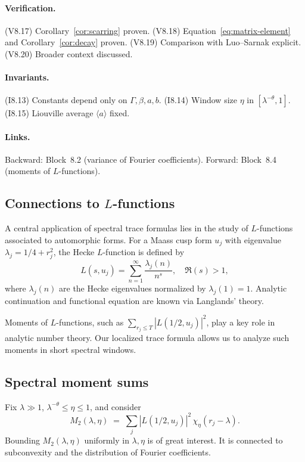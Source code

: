 \paragraph{Verification.}
(V8.17) Corollary~\ref{cor:scarring} proven.  
(V8.18) Equation~\eqref{eq:matrix-element} and Corollary~\ref{cor:decay} proven.  
(V8.19) Comparison with Luo–Sarnak explicit.  
(V8.20) Broader context discussed.  

\paragraph{Invariants.}
(I8.13) Constants depend only on $\Gamma,\beta,a,b$.  
(I8.14) Window size $\eta$ in $[\lambda^{-\theta},1]$.  
(I8.15) Liouville average $\langle a\rangle$ fixed.  

\paragraph{Links.}
Backward: Block~8.2 (variance of Fourier coefficients).  
Forward: Block~8.4 (moments of $L$-functions).  



\subsection{Connections to $L$-functions}
A central application of spectral trace formulas lies in the study of $L$-functions associated to automorphic forms. For a Maass cusp form $u_j$ with eigenvalue $\lambda_j = 1/4 + r_j^2$, the Hecke $L$-function is defined by
\[
L(s,u_j) = \sum_{n=1}^\infty \frac{\lambda_j(n)}{n^s}, \quad \Re(s)>1,
\]
where $\lambda_j(n)$ are the Hecke eigenvalues normalized by $\lambda_j(1)=1$. Analytic continuation and functional equation are known via Langlands’ theory.

Moments of $L$-functions, such as $\sum_{r_j\le T} |L(1/2,u_j)|^2$, play a key role in analytic number theory. Our localized trace formula allows us to analyze such moments in short spectral windows.

\subsection{Spectral moment sums}
Fix $\lambda\gg 1$, $\lambda^{-\theta}\le \eta\le 1$, and consider
\begin{equation}\label{eq:moment-def}
M_2(\lambda,\eta)\;=\;\sum_j |L(1/2,u_j)|^2\,\chi_\eta(r_j-\lambda).
\end{equation}
Bounding $M_2(\lambda,\eta)$ uniformly in $\lambda,\eta$ is of great interest. It is connected to subconvexity and the distribution of Fourier coefficients.

